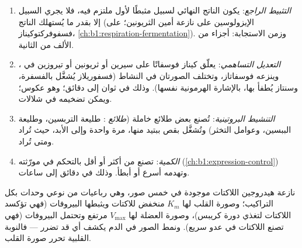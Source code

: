 \begin{proposition}\label{prop:b1:enzymes:control}
\begin{enumerate}
  \item \emph{التثبيط الراجع}: يكون الناتج
        النهائي لسبيل مثبطًا  لأول  ملتزم فيه، فلا
        يجري السبيل إلا بقدر ما يُستهلك الناتج (الإيزولوسين على نازعة
        أمين الثريونين؛  على فسفوفركتوكيناز،
        \cref{ch:b1:respiration-fermentation}). وزمن الاستجابة:
        أجزاء من الألف من الثانية.
  \item \emph{التعديل التساهمي}: يعلّق كيناز
        فوسفاتًا على سيرين أو ثريونين أو تيروزين في ، وينزعه
        فوسفاتاز، وتختلف الصورتان في النشاط (فسفوريلاز 
        يُشغَّل بالفسفرة، وسنتاز  يُطفأ بها، بالإشارة
        الهرمونية نفسها). وذلك في ثوان إلى دقائق؛ وهو عكوس؛ ويمكن
        تضخيمه في شلالات.
  \item \emph{التنشيط  البروتينية}: تُصنع بعض 
        طلائع خاملة (\emph{طلائع }: طليعة التربسين، وطليعة
        الببسين، وعوامل التخثر) وتُشغَّل بقص ببتيد منها، مرة واحدة
        وإلى الأبد، حيث تُراد ومتى تُراد.
  \item \emph{الكمية}: تصنع  من  أكثر أو أقل بالتحكم في
        مورّثته (\cref{ch:b1:expression-control}) وتهدمه أسرع أو
        أبطأ. وذلك في دقائق إلى ساعات.
\end{enumerate}
\end{proposition}

\begin{example}\label{ex:b1:enzymes:isoenzymes}
نازعة هيدروجين اللاكتات موجودة في خمس صور، وهي رباعيات من نوعي وحدات
بكل التراكيب؛ وصورة القلب لها $K_m$ منخفض للاكتات ويثبطها البيروفات
(فهي تؤكسد اللاكتات لتغذي دورة كريبس)، وصورة العضلة لها $V_{\max}$
مرتفع وتحتمل البيروفات (فهي تصنع اللاكتات في عدو سريع). ونمط الصور في
الدم يكشف أي  قد تضرر --- فالنوبة القلبية تحرر صورة القلب.
\end{example}

